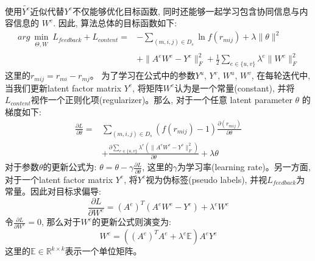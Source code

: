 使用$\widetilde{Y^e}$近似代替$Y^e$不仅能够优化目标函数, 同时还能够一起学习包含协同信息与内容信息的 $W^{e}$. 因此, 算法总体的目标函数如下:
\begin{equation}
\begin{split}
arg \min_{\substack{\Theta, W}} L_{feedback}+L_{content}  = 
& - \sum_{\left(m,i,j\right) \in D_s} \ln f \left( r_{mij}\right) + \lambda\|\theta\|^2\\
& + \|A^eW^e-Y^e\|^2_F + \frac 12 \sum_{e\in \{u,v\}}\lambda^e\|W^e\|^2_F 
\end{split}
\end{equation}
这里的$r_{mij} = r_{mi} -r_{mj}$。
为了学习在公式中的参数$Y^u$, $Y^v$, $W^u$, $W^v$, 在每轮迭代中, 当我们更新latent factor matrix $Y^e$, 将矩阵$W^e$认为是一个常量(constant), 并将$L_{content}$视作一个正则化项(regularizer)。那么, 对于一个任意 latent parameter $\theta$ 的梯度如下:
\begin{equation}
\begin{split}
\frac{\partial L}{\partial\theta} = 
& \sum_{\left(m,i,j\right) \in D_s}\left(f\left(r_{mij}\right) - 1\right) 
\frac{\partial \left(r_{mij}\right)}{\partial \theta}\\
& + \frac{\partial \sum_{e \in \{u,v\} } \lambda^e \left(\|A^eW^e-Y^e\|_F^2\right)}{\partial \theta}   + \lambda \theta 
\end{split}
\end{equation}
对于参数$\theta$的更新公式为: $\theta = \theta - \gamma \frac{\partial L}{\partial \theta}$, 这里的$\gamma$为学习率(learning rate)。另一方面, 对于一个latent factor matrix $Y^e$, 将$Y^e$视为伪标签(pseudo labels), 并视$L_{feedback}$为常量。因此对目标求偏导:
\begin{equation}
\frac{\partial L}{\partial W^e} = \left(A^e\right)^T\left(A^eW^e-Y^e\right) + \lambda^e W^e
\end{equation} 
令$\frac{\partial L}{\partial W^e} = 0$, 那么对于$W^e$的更新公式则演变为:
\begin{equation}
\label{equ:W}
W^e = \left(\left(A^e\right)^TA^e + \lambda^e\mathbb{E}\right)A^eY^e
\end{equation}
这里的$\mathbb{E} \in \mathbb{R}^{k\times k}$表示一个单位矩阵。

